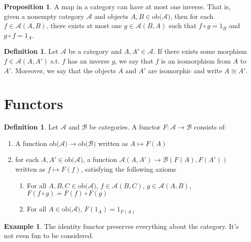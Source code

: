 \documentclass{article}
\theoremstyle{definition}
\newtheorem{proposition}[theorem]{Proposition}
\newtheorem{definition}[theorem]{Definition}
\newtheorem{example}[theorem]{Example}
\newcommand{\cat}[1]{\mathscr{#1}}
\newcommand{\catobj}[1]{\text{ob(}\cat{#1}\text{)}}
\newcommand{\catmor}[3]{\cat{#1}(#2, #3)}
\begin{document}
\begin{proposition}
    A map in a category can have at most one inverse. That is, given a nonempty category $\cat{A}$ and objects $A, B \in \catobj{A}$, then for each $f \in \catmor{A}{A}{B}$, there exists at most one $g \in \catmor{A}{B}{A}$ such that $f \circ g = 1_B$ and $g \circ f = 1_A$.
\end{proposition}


\begin{definition}
    Let $\cat{A}$ be a category and $A, A' \in \cat{A}$. If there exists some morphism $f \in \catmor{A}{A}{A'}$ s.t. $f$ has an inverse $g$, we say that $f$ is an isomorphism from $A$ to $A'$. Moreover, we say that the objects $A$ and $A'$ are isomorphic and write $A \cong A'$.
\end{definition}

\section{Functors}

\begin{definition}
    Let $\cat{A}$ and $\cat{B}$ be categories. A functor $F : \cat{A} \to \cat{B}$ consists of:
    \begin{enumerate}
        \item A function $\catobj{A} \to \catobj{B}$ written as $A \mapsto F(A)$
        \item for each $A, A' \in \catobj{A}$, a function $\catmor{A}{A}{A'} \to \catmor{B}{F(A)}{F(A')}$ written as $f \mapsto F(f)$, satisfying the following axioms
              \begin{enumerate}
                  \item For all $A, B, C \in \catobj{A}$, $f \in \catmor{A}{B}{C}$, $g \in \catmor{A}{A}{B}$, $F(f \circ g) = F(f) \circ F(g)$
                  \item For all $A \in \catobj{A}$, $F(1_A)=1_{F(A)}$
              \end{enumerate}
    \end{enumerate}
\end{definition}

\begin{example}
    The identity functor preserves everything about the category. It's not even fun to be considered.
\end{example}
\end{document}
